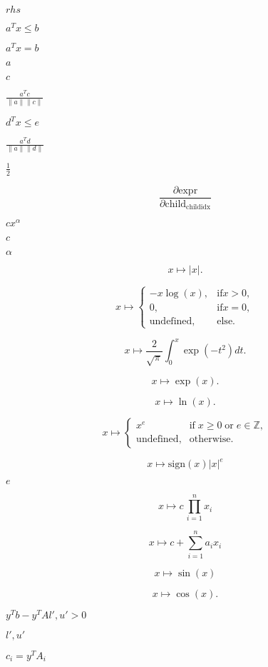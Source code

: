 \documentclass{article}
\begin{document}
$rhs$
\pagebreak

$ a^T x \leq b $
\pagebreak

$ a^T x = b $
\pagebreak

$ a $
\pagebreak

$ c $
\pagebreak

$ \frac{a^T c}{\|a\| \|c\|} $
\pagebreak

$ d^T x \leq e$
\pagebreak

$ \frac{a^T d}{\|a\| \|d\|} $
\pagebreak

$ \frac{1}{2} $
\pagebreak

\[
  \frac{\partial \text{expr}}{\partial \text{child}_{\text{childidx}}}
\]
\pagebreak

$cx^\alpha$
\pagebreak

$c$
\pagebreak

$\alpha$
\pagebreak

\[
  x \mapsto |x|.
\]
\pagebreak

\[
  x \mapsto \begin{cases}
    -x\log(x), & \mathrm{if} x > 0,\\
    0, & \mathrm{if} x = 0, \\
    \mathrm{undefined}, & \mathrm{else}.
    \end{cases}
\]
\pagebreak

\[
  x \mapsto \frac{2}{\sqrt{\pi}}\int_0^x \exp(-t^2) dt.
\]
\pagebreak

\[
  x \mapsto \exp(x).
\]
\pagebreak

\[
  x \mapsto \ln(x).
\]
\pagebreak

\[
  x \mapsto \begin{cases}
    x^e & \textrm{if}\; x \geq 0\; \textrm{or}\; e\in\mathbb{Z}, \\
    \textrm{undefined}, & \textrm{otherwise}.
    \end{cases}
\]
\pagebreak

\[
  x \mapsto \textrm{sign}(x) |x|^e
\]
\pagebreak

$e$
\pagebreak

\[
  x \mapsto c\,\prod_{i=1}^n x_i
\]
\pagebreak

\[
  x \mapsto c + \sum_{i=1}^n a_i x_i
\]
\pagebreak

\[
  x \mapsto \sin(x)
\]
\pagebreak

\[
  x \mapsto \cos(x).
\]
\pagebreak

$y^Tb - y^TA{l',u'} > 0$
\pagebreak

$l',u'$
\pagebreak

$c_i = y^TA_i$
\pagebreak
\end{document}
